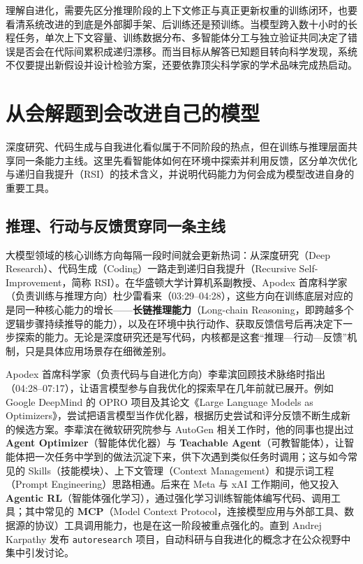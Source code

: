 \documentclass[UTF8,a4paper,11pt,fontset=fandol]{ctexart}
\begin{document}
理解自进化，需要先区分推理阶段的上下文修正与真正更新权重的训练闭环，也要看清系统改进的到底是外部脚手架、后训练还是预训练。当模型跨入数十小时的长程任务，单次上下文容量、训练数据分布、多智能体分工与独立验证共同决定了错误是否会在代际间累积成递归漂移。而当目标从解答已知题目转向科学发现，系统不仅要提出新假设并设计检验方案，还要依靠顶尖科学家的学术品味完成热启动。
\section{从会解题到会改进自己的模型}
深度研究、代码生成与自我进化看似属于不同阶段的热点，但在训练与推理层面共享同一条能力主线。这里先看智能体如何在环境中探索并利用反馈，区分单次优化与递归自我提升（RSI）的技术含义，并说明代码能力为何会成为模型改进自身的重要工具。
\subsection{推理、行动与反馈贯穿同一条主线}
大模型领域的核心训练方向每隔一段时间就会更新热词：从深度研究（Deep Research）、代码生成（Coding）一路走到递归自我提升（Recursive Self-Improvement，简称 RSI）。在华盛顿大学计算机系副教授、Apodex 首席科学家（负责训练与推理方向）杜少雷看来（03:29–04:28），这些方向在训练底层对应的是同一种核心能力的增长——\textbf{长链推理能力}（Long-chain Reasoning，即跨越多个逻辑步骤持续推导的能力），以及在环境中执行动作、获取反馈信号后再决定下一步探索的能力。无论是深度研究还是写代码，内核都是这套“推理—行动—反馈”机制，只是具体应用场景存在细微差别。

Apodex 首席科学家（负责代码与自进化方向）李辈滨回顾技术脉络时指出（04:28–07:17），让语言模型参与自我优化的探索早在几年前就已展开。例如 Google DeepMind 的 OPRO 项目及其论文《Large Language Models as Optimizers》，尝试把语言模型当作优化器，根据历史尝试和评分反馈不断生成新的候选方案。李辈滨在微软研究院参与 AutoGen 相关工作时，他的同事也提出过 \textbf{Agent Optimizer}（智能体优化器）与 \textbf{Teachable Agent}（可教智能体），让智能体把一次任务中学到的做法沉淀下来，供下次遇到类似任务时调用；这与如今常见的 Skills（技能模块）、上下文管理（Context Management）和提示词工程（Prompt Engineering）思路相通。后来在 Meta 与 xAI 工作期间，他又投入 \textbf{Agentic RL}（智能体强化学习），通过强化学习训练智能体编写代码、调用工具；其中常见的 \textbf{MCP}（Model Context Protocol，连接模型应用与外部工具、数据源的协议）工具调用能力，也是在这一阶段被重点强化的。直到 Andrej Karpathy 发布 \texttt{autoresearch} 项目，自动科研与自我进化的概念才在公众视野中集中引发讨论。
\end{document}
